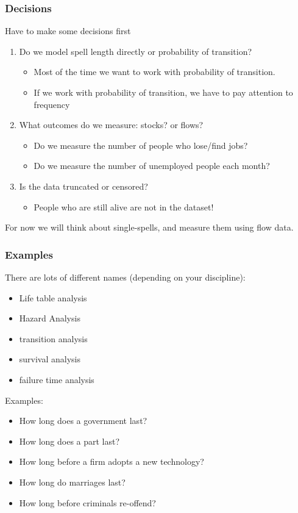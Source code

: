 \documentclass[xcolor=pdftex,dvipsnames,table,mathserif]{beamer}
\begin{document}
\begin{frame}
\frametitle{Decisions}
Have to make some decisions first
\begin{enumerate}
\item Do we model \alert{spell length} directly or \alert{probability of transition}?
\begin{itemize}
\item Most of the time we want to work with probability of transition.
\item If we work with probability of transition, we have to pay attention to \alert{frequency}
\end{itemize}
\item What outcomes do we measure: \alert{stocks}? or \alert{flows}?
\begin{itemize}
\item Do we measure the number of people who lose/find jobs?
\item Do we measure the number of unemployed people each month?
\end{itemize}
\item Is the data \alert{truncated} or \alert{censored}?
\begin{itemize}
\item People who are still alive are not in the dataset!
\end{itemize}
\end{enumerate}
For now we will think about \alert{single-spells}, and measure them using \alert{flow data}.
\end{frame}

\begin{frame}
\frametitle{Examples}
There are lots of different names (depending on your discipline):
\begin{itemize}
\item Life table analysis
\item Hazard Analysis
\item transition analysis
\item survival analysis
\item failure time analysis
\end{itemize}
Examples:
\begin{itemize}
\item How long does a government last?
\item How long does a part last?
\item How long before a firm adopts a new technology?
\item How long do marriages last?
\item How long before criminals re-offend?
\end{itemize}
\end{frame}
\end{document}
